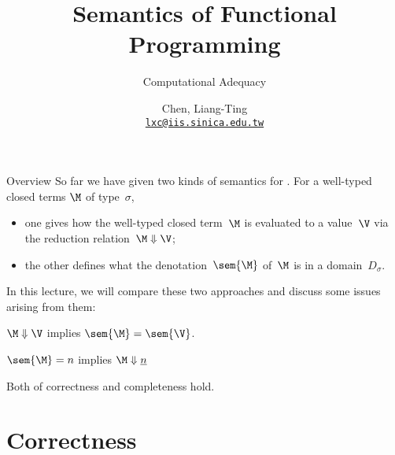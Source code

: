 \title{Semantics of Functional Programming}
\subtitle{Computational Adequacy}
\author[L.-T. Chen]{Chen, Liang-Ting\\
  \href{mailto:lxc@iis.sinica.edu.tw}{\texttt{lxc@iis.sinica.edu.tw}}}

\frame{\maketitle}

\begin{frame}{Overview}
  So far we have given two kinds of semantics for \PCF{}. For a well-typed
  closed terms $\M$ of
  type~$\sigma$,
  \begin{itemize}
    \item one gives how the well-typed closed term~$\M$ is evaluated to a value~$\V$
      via the reduction relation~$\M \Downarrow\V$;
    \item the other defines what the denotation~$\sem{\M}$ of~$\M$ is in a
      domain~$D_\sigma$. 
    \end{itemize}
  In this lecture, we will compare these two approaches and discuss some issues
  arising from them:
  \begin{description}
    \item[Correctness] $\M \Downarrow \V$ implies $\sem{\M} = \sem{\V}$.
    \item[Completeness] $\sem{\M} = n$ implies $\M \Downarrow \underline{n}$
    \item[Computational adequacy]
      Both of correctness and completeness hold. 
  \end{description}

\end{frame}

\section{Correctness}

